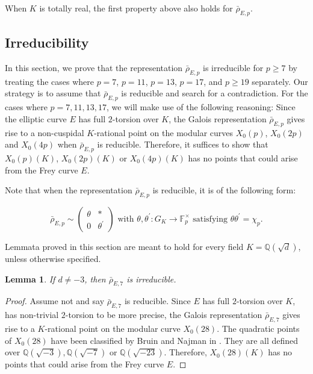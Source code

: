 \documentclass[]{article}
\newtheorem{lemma}{Lemma}
\newcommand {\QQ}{{\mathbb{Q}}}
\newcounter{cases}
\begin{document}
When $K$ is totally real, the first property above also holds for $\bar{\rho}_{E, p}$.

\subsection{Irreducibility}\label{section:irreducibility}


In this section, we prove that the representation $\bar{\rho}_{E, p}$ is irreducible for $p\ge 7$ by treating the cases where 
$p=7$, $p=11$, $p=13$, $p=17$, and $p\ge 19$ separately. Our strategy is to assume that $\bar{\rho}_{E, p}$ is reducible and search for a contradiction. For the cases where $p=7,11,13,17$, we will make use of the following reasoning: Since the elliptic curve $E$ has full $2$-torsion over $K$, the Galois representation $\bar{\rho}_{E, p}$ gives rise to a non-cuspidal $K$-rational point on the modular curves $X_0(p)$, $X_0(2p)$ and $X_0(4p)$ when $\bar{\rho}_{E, p}$ is reducible. Therefore, it suffices to show that  $X_0(p)(K)$, $X_0(2p)(K)$ or $X_0(4p)(K)$ has no points that could arise from the Frey curve $E$. 

Note that when the representation $\bar{\rho}_{E, p}$ is reducible, it is of the following form:

$$
\bar{\rho}_{E, p} \sim\left(\begin{array}{cc}
\theta & * \\
0 & \theta^{\prime}
\end{array}\right) \text { with } \theta, \theta^{\prime}: G_K \rightarrow \mathbb{F}_p^{\times}  \text { satisfying } \theta \theta^{\prime}=\chi_p.
$$

Lemmata proved in this section are meant to hold for every field $K=\QQ(\sqrt{d})$, unless otherwise specified.

\begin{lemma}\label{irred7}
 If $d\ne -3$, then $\bar{\rho}_{E, 7}$ is irreducible.   
\end{lemma}

\begin{proof}
 Assume not and say $\bar{\rho}_{E, 7}$ is reducible. Since $E$ has full $2$-torsion over $K$, has non-trivial $2$-torsion to be more precise, the Galois representation $\bar{\rho}_{E, 7}$ gives rise to a $K$-rational point on the modular curve $X_0(28)$. The quadratic points of $X_0(28)$ have been classified by Bruin and Najman in \cite[Table 4]{bruin2015hyperelliptic}. They are all defined over $\QQ(\sqrt{-3}),\QQ(\sqrt{-7})$ or $\QQ(\sqrt{-23})$. Therefore, $X_0(28)(K)$ has no points that could arise from the Frey curve $E$.     
\end{proof}
\end{document}
